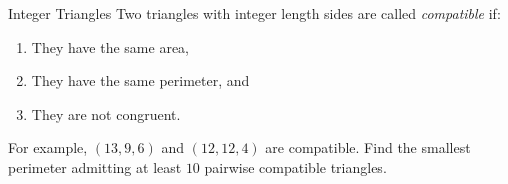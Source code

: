 \begin{problem}{Integer Triangles}
    Two triangles with integer length sides are called \emph{compatible} if:
    \begin{enumerate}
        \item They have the same area,
        \item They have the same perimeter, and
        \item They are not congruent.
    \end{enumerate}
    For example, \((13, 9, 6)\) and \((12, 12, 4)\) are compatible. Find the smallest perimeter admitting at least \(10\) pairwise compatible triangles.
    
\end{problem}
